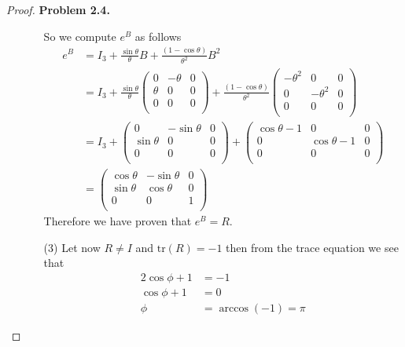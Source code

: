 \documentclass[11pt]{article}
\newcommand{\tr}{\text{tr}}
\theoremstyle{definition}
\begin{document}
\begin{proof}{\textbf{Problem 2.4.}}
\begin{itemize}
\begin{itemize}
    So we compute $e^B$ as follows
    \begin{align*}
        e^B &= I_3 + \frac{\sin\theta}{\theta} B + \frac{(1 - \cos\theta)}{\theta^2}B^2\\
        &= I_3 + \frac{\sin\theta}{\theta}\begin{pmatrix}
            0 & -\theta & 0 \\
            \theta & 0 & 0 \\
            0 & 0 & 0 \\
        \end{pmatrix}
        + \frac{(1 - \cos\theta)}{\theta^2}\begin{pmatrix}
            -\theta^2 & 0 & 0 \\
            0 & -\theta^2 & 0 \\
            0 & 0 & 0 \\
        \end{pmatrix}\\
        &= I_3 + \begin{pmatrix}
            0 & -\sin\theta & 0 \\
            \sin\theta & 0 & 0 \\
            0 & 0 & 0 \\
        \end{pmatrix}
        + \begin{pmatrix}
            \cos\theta - 1 & 0 & 0 \\
            0 & \cos\theta - 1 & 0 \\
            0 & 0 & 0 \\
        \end{pmatrix}\\
        &=  \begin{pmatrix}
            \cos\theta & -\sin\theta & 0 \\
            \sin\theta & \cos\theta & 0 \\
            0 & 0 & 1 \\
        \end{pmatrix}
    \end{align*}
    Therefore we have proven that $e^B = R$.
    \item [(3)] Let now $R \neq I$ and $\tr(R) = -1$ then from the trace
    equation we see that 
    \begin{align*}
        2\cos\phi + 1 &= -1\\
        \cos\phi + 1 &= 0\\
        \phi &= \arccos(-1) = \pi
    \end{align*}

\end{itemize}
\end{itemize}
\end{proof}
\end{document}

